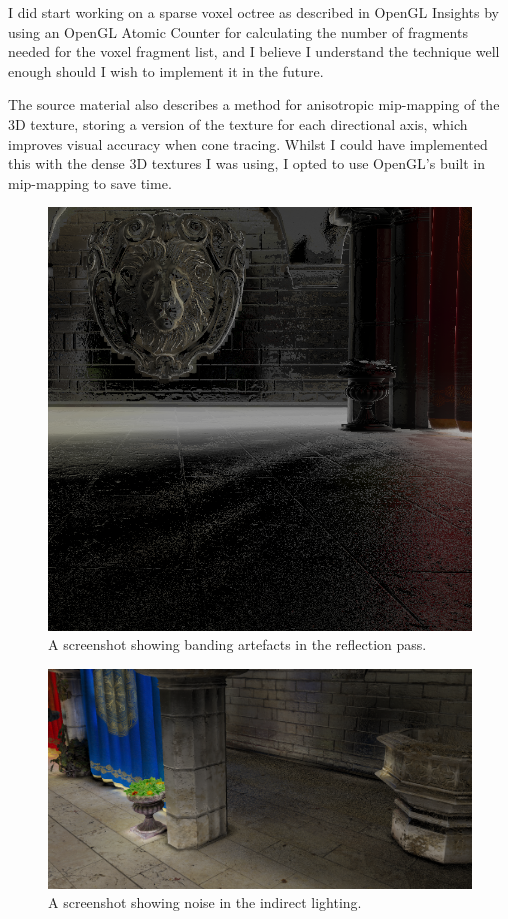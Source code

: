 \documentclass[]{acmsiggraph}
\begin{document}
I did start working on a sparse voxel octree as described in OpenGL Insights\cite{crassin_green_2012} by using an OpenGL Atomic Counter for calculating the number of fragments needed for the voxel fragment list, and I believe I understand the technique well enough should I wish to implement it in the future.

The source material\cite{crassin_neyret_sainz_green_eisemann_2011} also describes a method for anisotropic mip-mapping of the 3D texture, storing a version of the texture for each directional axis, which improves visual accuracy when cone tracing. Whilst I could have implemented this with the dense 3D textures I was using, I opted to use OpenGL's built in mip-mapping to save time.

\begin{figure}[htbp]\centering
 \includegraphics[width=1.0\linewidth]{images/banding.png}
 \caption{\label{fig:reference}A screenshot showing banding artefacts in the reflection pass.}
\end{figure}

\begin{figure}[htbp]\centering
 \includegraphics[width=1.0\linewidth]{images/indirect_noise.png}
 \caption{\label{fig:reference}A screenshot showing noise in the indirect lighting.}
\end{figure}
\end{document}
